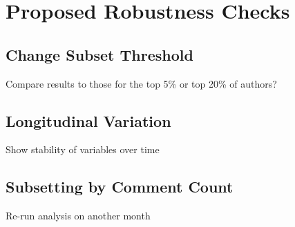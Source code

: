 \section{Proposed Robustness Checks}

\subsection{Change Subset Threshold}

Compare results to those for the top 5\% or top 20\% of authors?

\subsection{Longitudinal Variation}

Show stability of variables over time

\subsection{Subsetting by Comment Count}

Re-run analysis on another month